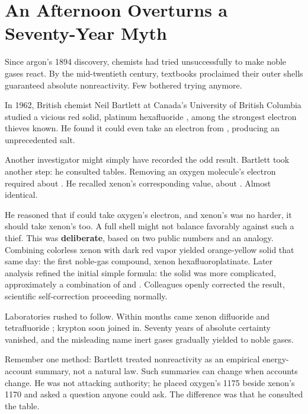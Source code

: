 \section{An Afternoon Overturns a Seventy-Year Myth}

\begin{zhengju}
Since argon's 1894 discovery, chemists had tried unsuccessfully to make noble gases react. By the mid-twentieth century, textbooks proclaimed their outer shells guaranteed absolute nonreactivity. Few bothered trying anymore.

In 1962, British chemist Neil Bartlett at Canada's University of British Columbia studied a vicious red solid, platinum hexafluoride , among the strongest electron thieves known. He found it could even take an electron from , producing an unprecedented salt.

Another investigator might simply have recorded the odd result. Bartlett took another step: he consulted tables. Removing an oxygen molecule's electron required about . He recalled xenon's corresponding value, about . Almost identical.

He reasoned that if  could take oxygen's electron, and xenon's was no harder, it should take xenon's too. A full shell might not balance favorably against such a thief. This was \textbf{deliberate}, based on two public numbers and an analogy. Combining colorless xenon with dark red  vapor yielded orange-yellow solid that same day: the first noble-gas compound, xenon hexafluoroplatinate. Later analysis refined the initial simple formula: the solid was more complicated, approximately a combination of  and . Colleagues openly corrected the result, scientific self-correction proceeding normally.

Laboratories rushed to follow. Within months came xenon difluoride  and tetrafluoride ; krypton soon joined in. Seventy years of absolute certainty vanished, and the misleading name inert gases gradually yielded to noble gases.

Remember one method: Bartlett treated nonreactivity as an empirical energy-account summary, not a natural law. Such summaries can change when accounts change. He was not attacking authority; he placed oxygen's 1175 beside xenon's 1170 and asked a question anyone could ask. The difference was that he consulted the table.
\end{zhengju}

